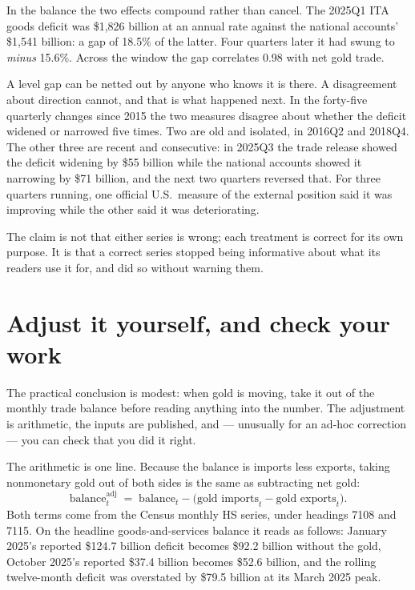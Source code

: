 \documentclass[11pt]{article}
\begin{document}
In the balance the two effects compound rather than cancel. The 2025Q1 ITA
goods deficit was \$1,826 billion at an annual rate against the national
accounts' \$1,541 billion: a gap of 18.5\% of the latter. Four quarters later
it had swung to \textit{minus} 15.6\%. Across the window the gap correlates
0.98 with net gold trade.

A level gap can be netted out by anyone who knows it is there. A disagreement
about direction cannot, and that is what happened next. In the forty-five
quarterly changes since 2015 the two measures disagree about whether the
deficit widened or narrowed five times. Two are old and isolated, in 2016Q2 and
2018Q4. The other three are recent and consecutive: in 2025Q3 the trade release
showed the deficit widening by \$55 billion while the national accounts showed
it narrowing by \$71 billion, and the next two quarters reversed that. For three quarters running, one official U.S.\ measure of the
external position said it was improving while the other said it was
deteriorating.

The claim is not that either series is wrong; each treatment is correct for its
own purpose. It is that a correct series stopped being informative about what
its readers use it for, and did so without warning them.

\section{Adjust it yourself, and check your work}

The practical conclusion is modest: when gold is moving, take it out of the
monthly trade balance before reading anything into the number. The adjustment
is arithmetic, the inputs are published, and --- unusually for an ad-hoc
correction --- you can check that you did it right.

The arithmetic is one line. Because the balance is imports less exports, taking
nonmonetary gold out of both sides is the same as subtracting net gold:
\[
  \text{balance}^{\text{adj}}_{t}
  \;=\;
  \text{balance}_{t} - \bigl(\text{gold imports}_{t} - \text{gold exports}_{t}\bigr).
\]
Both terms come from the Census monthly HS series, under headings 7108 and
7115. On the headline
goods-and-services balance it reads as follows: January 2025's reported \$124.7
billion deficit becomes \$92.2 billion without the gold, October 2025's
reported \$37.4 billion becomes \$52.6 billion, and the rolling twelve-month
deficit was overstated by \$79.5 billion at its March 2025 peak.
\end{document}
